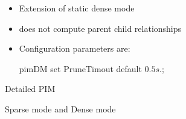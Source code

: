 \documentclass[landscape]{foils}
\begin{document}
\begin{comment}
\item one object per node
\end{comment}

\begin{itemize}
\item Extension of static dense mode
\item does not compute parent child relationships
\item Configuration parameters are:
  \begin{program}\small
    pimDM set PruneTimout  \; default \(0.5s.\);
  \end{program}
\end{itemize}

\begin{comment}
\item one object per node
\end{comment}

\begin{list}{}{}
\item Detailed PIM
  \begin{list}{}{}
  \item Sparse mode and Dense mode
  \end{list}
\end{list}

\begin{comment}
  \item will be a comprehensive implementaiton of PIM
\end{comment}



\begin{comment}
\item \verb|\placefig{mcastArch}|
\item mirros unicast route architecture
\item global centr mcast comp module
\item relies on centr rp compmodule
\item default computation for rp
\item General Multicast:
McastProtocol      -- mcast protocol mechanism (DM, 
dynamicDM)
McastProtoArbiter  -- mcast arbiter
Classifier/Replicator/Demuxer   -- mcast classifier (parse pkts, get 
(s,g,iif), and forward to (s,g,iif) replicator)
Classifier/Multicast/Replicator -- replicator for each (s,g, iif) (
copy pkts and forward to all oifs)

\item Centralized Multicast:
CtrMcast     -- install mcast routing entries per node
CtrMcastComp -- compute mcast trees via unicast routing table
CtrRPComp    -- compute RP Set for shared trees
\end{comment}
\end{document}
